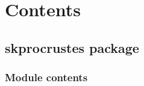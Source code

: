 \documentclass[a4paper,10pt,english]{sphinxmanual}
\begin{document}
\chapter{Contents}
\label{\detokenize{index:contents}}

\section{skprocrustes package}
\label{\detokenize{skprocrustes::doc}}\label{\detokenize{skprocrustes:skprocrustes-package}}

\subsection{Module contents}
\label{\detokenize{skprocrustes:module-skprocrustes}}\label{\detokenize{skprocrustes:module-contents}}
\end{document}
